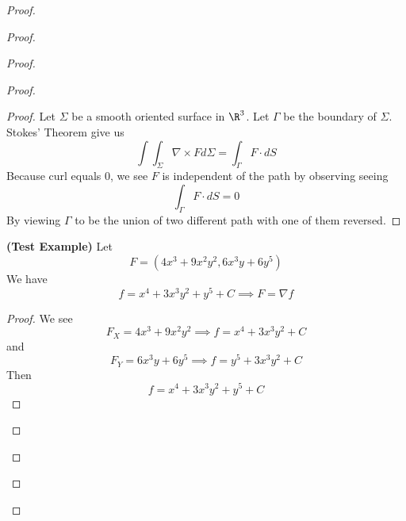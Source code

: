 \documentclass{report}
\begin{document}
\begin{proof}
\begin{proof}
\begin{proof}
\begin{proof}
\begin{proof}
Let $\Sigma$ be a smooth oriented surface in  $\R^3$. Let  $\Gamma$ be the boundary of  $\Sigma$. Stokes' Theorem give us
 \begin{equation}
\int \int_{\Sigma} \nabla \times F d\Sigma =\int_{\Gamma} F\cdot dS
\end{equation}
Because curl equals $0$, we see  $F$ is independent of the path by observing seeing 
 \begin{equation}
\int_{\Gamma} F\cdot dS=0
\end{equation}
By viewing $\Gamma$ to be the union of two different path with one of them reversed. 
\end{proof}
\begin{theorem}
\label{9.2.9}
\textbf{(Test Example)} Let
\begin{equation}
F=(4x^3+9x^2y^2,6x^3y+6y^5)
\end{equation}
We have
\begin{equation}
f=x^4+3x^3y^2+y^5+C\implies F=\nabla f
\end{equation}
\end{theorem}
\begin{proof}
We see 
\begin{equation}
F_X=4x^3+9x^2y^2 \implies f=x^4+3x^3y^2+C
\end{equation}
and
\begin{equation}
F_Y=6x^3y+6y^5\implies f=y^5+3x^3y^2+C
\end{equation}
Then 
\begin{equation}
f=x^4+3x^3y^2+y^5+C
\end{equation}
\end{proof}

\end{proof}
\end{proof}
\end{proof}
\end{proof}
\end{document}
